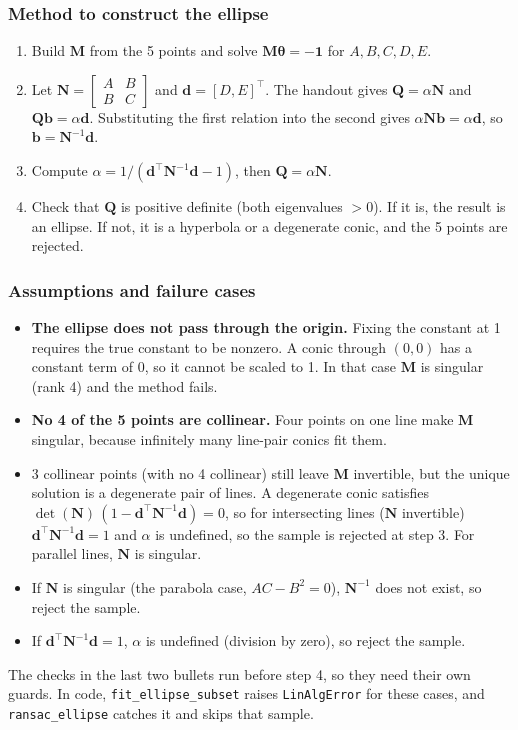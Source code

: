 \documentclass[11pt]{article}
\newcommand{\vect}[1]{\mathbf{#1}}
\newcommand{\mat}[1]{\mathbf{#1}}
\begin{document}
\subsubsection*{Method to construct the ellipse}
\begin{enumerate}
    \item Build $\mat{M}$ from the 5 points and solve $\mat{M}\bm{\theta} = -\vect{1}$ for $A, B, C, D, E$.
    \item Let $\mat{N} = \begin{bmatrix} A & B \\ B & C \end{bmatrix}$ and $\vect{d} = [D, E]^\top$. The handout gives $\mat{Q} = \alpha\mat{N}$ and $\mat{Q}\vect{b} = \alpha\vect{d}$. Substituting the first relation into the second gives $\alpha\mat{N}\vect{b} = \alpha\vect{d}$, so $\vect{b} = \mat{N}^{-1}\vect{d}$.
    \item Compute $\alpha = 1 / (\vect{d}^\top\mat{N}^{-1}\vect{d} - 1)$, then $\mat{Q} = \alpha\mat{N}$.
    \item Check that $\mat{Q}$ is positive definite (both eigenvalues $> 0$). If it is, the result is an ellipse. If not, it is a hyperbola or a degenerate conic, and the 5 points are rejected.
\end{enumerate}

\subsubsection*{Assumptions and failure cases}
\begin{itemize}
    \item \textbf{The ellipse does not pass through the origin.} Fixing the constant at 1 requires the true constant to be nonzero. A conic through $(0, 0)$ has a constant term of 0, so it cannot be scaled to 1. In that case $\mat{M}$ is singular (rank 4) and the method fails.
    \item \textbf{No 4 of the 5 points are collinear.} Four points on one line make $\mat{M}$ singular, because infinitely many line-pair conics fit them.
    \item 3 collinear points (with no 4 collinear) still leave $\mat{M}$ invertible, but the unique solution is a degenerate pair of lines. A degenerate conic satisfies $\det(\mat{N})\,(1 - \vect{d}^\top\mat{N}^{-1}\vect{d}) = 0$, so for intersecting lines ($\mat{N}$ invertible) $\vect{d}^\top\mat{N}^{-1}\vect{d} = 1$ and $\alpha$ is undefined, so the sample is rejected at step 3. For parallel lines, $\mat{N}$ is singular.
    \item If $\mat{N}$ is singular (the parabola case, $AC - B^2 = 0$), $\mat{N}^{-1}$ does not exist, so reject the sample.
    \item If $\vect{d}^\top\mat{N}^{-1}\vect{d} = 1$, $\alpha$ is undefined (division by zero), so reject the sample.
\end{itemize}
The checks in the last two bullets run before step 4, so they need their own guards. In code, \texttt{fit\_ellipse\_subset} raises \texttt{LinAlgError} for these cases, and \texttt{ransac\_ellipse} catches it and skips that sample.
\end{document}
